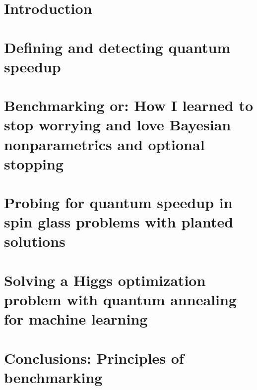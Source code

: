 \documentclass[10pt]{report}
\begin{document}
\chapter[Introduction]{Introduction}\label{ch:intro}

\chapter[Speedup]{Defining and detecting quantum speedup}\label{ch:speedup}

\chapter[Benchmarking]{Benchmarking or: How I learned to stop worrying and love Bayesian nonparametrics and optional stopping}\label{ch:benchmarking}

\chapter[Planted]{Probing for quantum speedup in spin glass problems with planted solutions}\label{ch:planted}

\chapter[Higgs]{Solving a Higgs optimization problem with quantum annealing for machine learning}\label{ch:higgs}

% 
\chapter[Conclusion]{Conclusions: Principles of benchmarking}\label{ch:conclusion}

\label{app:MAB}

\end{document}
